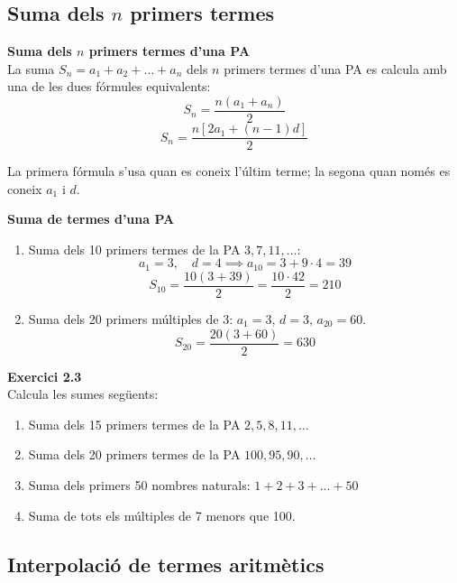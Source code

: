 \documentclass[12pt]{article}
\begin{document}
\subsection{Suma dels $n$ primers termes}

\begin{concept}
\textbf{Suma dels $n$ primers termes d'una PA}\\
La suma $S_n = a_1 + a_2 + \dots + a_n$ dels $n$ primers termes d'una PA es calcula amb una de les dues fórmules equivalents:
\[
\boxed{S_n = \dfrac{n(a_1 + a_n)}{2}}
\]
\[
\boxed{S_n = \dfrac{n \left[ 2a_1 + (n-1)d \right]}{2}}
\]

La primera fórmula s'usa quan es coneix l'últim terme; la segona quan només es coneix $a_1$ i $d$.
\end{concept}

\begin{exemple}
\textbf{Suma de termes d'una PA}
\begin{enumerate}[label=\alph*)]
    \item Suma dels 10 primers termes de la PA $3, 7, 11, \dots$:
    \[
    a_1 = 3, \quad d = 4 \implies a_{10} = 3 + 9 \cdot 4 = 39
    \]
    \[
    S_{10} = \dfrac{10(3+39)}{2} = \dfrac{10 \cdot 42}{2} = 210
    \]
    \item Suma dels 20 primers múltiples de 3: $a_1 = 3$, $d = 3$, $a_{20} = 60$.
    \[
    S_{20} = \dfrac{20(3+60)}{2} = 630
    \]
\end{enumerate}
\end{exemple}

\begin{exercici}
\textbf{Exercici 2.3}\\
Calcula les sumes següents:
\begin{enumerate}[label=\alph*)]
    \item Suma dels 15 primers termes de la PA $2, 5, 8, 11, \dots$
    \item Suma dels 20 primers termes de la PA $100, 95, 90, \dots$
    \item Suma dels primers 50 nombres naturals: $1 + 2 + 3 + \dots + 50$
    \item Suma de tots els múltiples de 7 menors que 100.
\end{enumerate}
\end{exercici}

\subsection{Interpolació de termes aritmètics}
\end{document}
